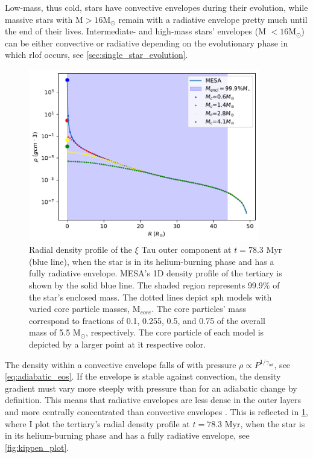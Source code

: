 Low-mass, thus cold, stars have convective envelopes during their evolution, while massive stars with M$>16$M$_{\odot}$ remain with a radiative envelope pretty much until the end of their lives. Intermediate- and high-mass stars' envelopes (M  $<16$M$_{\odot}$) can be either convective or radiative depending on the evolutionary phase in which \ac{rlof} occurs, see \cref{sec:single_star_evolution}. 
\begin{figure}[H]
    \centering
    \includegraphics[width=0.9\textwidth]{Thesis/graphs/density_profile_radiative_envelope.pdf}
    \caption{Radial density profile of the  $\xi$ Tau outer component at $t=78.3$ Myr (blue line), when the star is in its helium-burning phase and has a fully radiative envelope. MESA's 1D density profile of the tertiary is shown by the solid blue line. The shaded region represents 99.9\% of the star's enclosed mass. The dotted lines depict \ac{sph} models with varied core particle masses, M$_{core}$. The core particles' mass correspond to fractions of 0.1, 0.255, 0.5, and 0.75 of the overall mass of 5.5 M$_{\odot}$, respectively. The core particle of each model is depicted by a larger point at it respective color.}
    \label{fig:density_profile_radiative}
\end{figure}
The density within a convective envelope falls of with pressure $\rho \propto P^{1/\gamma_{ad}}$, see \cref{eq:adiabatic_eos}. If the envelope is stable against convection, the density gradient must vary more steeply with pressure than for an adiabatic change by definition. This means that radiative envelopes are less dense in the outer layers and more centrally concentrated than convective envelopes \cite{pols2011stellar}. This is reflected in \cref{fig:density_profile_radiative}, where I plot the tertiary's radial density profile at $t=78.3$ Myr, when the star is in its helium-burning phase and has a fully radiative envelope, see \cref{fig:kippen_plot}.


